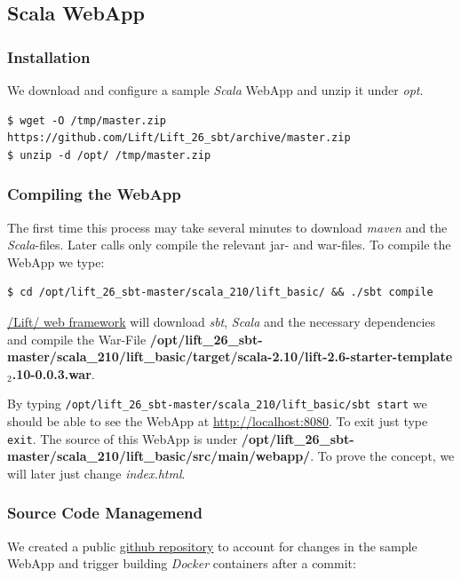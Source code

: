 \documentclass[captions=tableheading]{article}
\begin{document}
\subsection{Scala WebApp}
\label{sec-4-3}
\subsubsection{Installation}
\label{sec-4-3-1}

We download and configure a sample \emph{Scala} WebApp and unzip it under \emph{opt}.

\begin{verbatim}
$ wget -O /tmp/master.zip https://github.com/Lift/Lift_26_sbt/archive/master.zip
$ unzip -d /opt/ /tmp/master.zip
\end{verbatim}
\subsubsection{Compiling the WebApp}
\label{sec-4-3-2}

The first time this process may take several minutes to download \emph{maven} and the \emph{Scala}-files. Later calls only compile the relevant jar- and war-files. To compile the WebApp we type:

\begin{verbatim}
$ cd /opt/lift_26_sbt-master/scala_210/lift_basic/ && ./sbt compile
\end{verbatim}

\href{http:///Lift/web.net/getting_started}{/Lift/ web framework}  will download \emph{sbt}, \emph{Scala} and the necessary dependencies and compile the War-File \textbf{/opt/lift\_26\_sbt-master/scala\_210/lift\_basic/target/scala-2.10/lift-2.6-starter-template$_2$.10-0.0.3.war}. 
 
By typing \texttt{/opt/lift\_26\_sbt-master/scala\_210/lift\_basic/sbt  start} we should be able to see the WebApp at \href{http://localhost:8080}{http://localhost:8080}. To exit just type \texttt{exit}. The source of this WebApp is under \textbf{/opt/lift\_26\_sbt-master/scala\_210/lift\_basic/src/main/webapp/}. To prove the concept, we will later just change \emph{index.html}.
\subsubsection{Source Code Managemend}
\label{sec-4-3-3}

We created a public  \href{https://github.com/radiomix/scala-basic.git}{github repository} to account for changes in the sample WebApp and trigger building \emph{Docker} containers after a commit:
\end{document}
